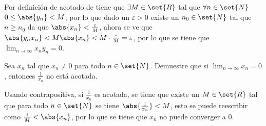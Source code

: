 \documentclass{ayudantia}
\begin{document}
\begin{ans}
    \begin{sol}
        Por definición de acotado de tiene que \(\exists M\in\set{R}\) tal que \(\forall n\in\set{N}\) \(0\leq\abs{y_n}<M\), por lo que dado un \(\varepsilon>0\) existe un \(n_0\in\set{N}\) tal que \(n\geq n_0\) da que \(\abs{x_n}<\frac\varepsilon{M}\), ahora se ve que \(\abs{y_nx_n}<M\abs{x_n}<M\cdot\frac\varepsilon{M}=\varepsilon\), por lo que se tiene que \(\lim_{n\rightarrow\infty}x_ny_n=0\).
    \end{sol}
\end{ans}



\begin{prob}
    Sea \(x_n\) tal que \(x_n\neq0\) para todo \(n\in\set{N}\). Demuestre que si \(\lim_{n\rightarrow\infty}x_n=0\), entonces \(\frac1{x_n}\) no está acotada.
\end{prob}

\begin{ans}
    \begin{sol}
        Usando contrapositiva, si \(\frac1{x_n}\) es acotada, se tiene que existe un \(M\in\set{R}\) tal que para todo \(n\in\set{N}\) se tiene \(\abs{\frac1{x_n}}<M\), esto se puede reescribir como \(\frac1{M}<\abs{x_n}\), por lo que se tiene que \(x_n\) no puede converger a \(0\).
    \end{sol}
\end{ans}
\end{document}
